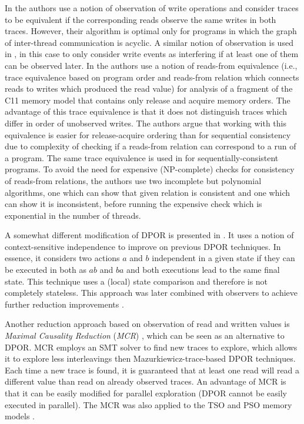 In  the authors use a notion of observation of write operations and consider traces to be equivalent if the corresponding reads observe the same writes in both traces.
However, their algorithm is optimal only for programs in which the graph of inter-thread communication is acyclic.
A similar notion of observation is used in , in this case to only consider write events as interfering if at least one of them can be observed later.
In  the authors use a notion of reads-from equivalence (i.e., trace equivalence based on program order and reads-from relation which connects reads to writes which produced the read value) for analysis of a fragment of the C11 memory model that contains only release and acquire memory orders.
The advantage of this trace equivalence is that it does not distinguish traces which differ in order of unobserved writes.
The authors argue that working with this equivalence is easier for release-acquire ordering than for sequential consistency due to complexity of checking if a reads-from relation can correspond to a run of a program.
The same trace equivalence is used in  for sequentially-consistent programs.
To avoid the need for expensive (NP-complete) checks for consistency of reads-from relations, the authors use two incomplete but polynomial algorithms, one which can show that given relation is consistent and one which can show it is inconsistent, before running the expensive check which is exponential in the number of threads.

A somewhat different modification of DPOR is presented in .
It uses a notion of context-sensitive independence to improve on previous DPOR techniques.
In essence, it considers two actions $a$ and $b$ independent in a given state if they can be executed in both as $ab$ and $ba$ and both executions lead to the same final state.
This technique uses a (local) state comparison and therefore is not completely stateless.
This approach was later combined with observers to achieve further reduction improvements .

Another reduction approach based on observation of read and written values is
\emph{Maximal Causality Reduction} (\emph{MCR}) , which can be
seen as an alternative to DPOR.
MCR employs an SMT solver to find new traces to explore, which allows it to
explore less interleavings then Mazurkiewicz-trace-based DPOR techniques.
Each time a new trace is found, it is guaranteed that at least one read will read a different value than read on already observed traces.
An advantage of MCR is that it can be easily modified for parallel
exploration (DPOR cannot be easily executed in parallel).
The MCR was also applied to the TSO and PSO memory models .

